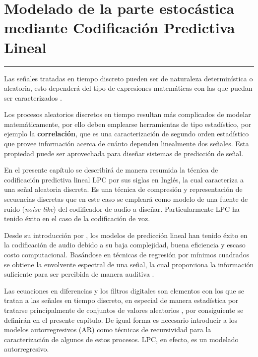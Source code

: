 
\chapter{Modelado de la parte estocástica \\ mediante Codificación Predictiva Lineal}\label{capit:cap4}
\vspace{-2.0325ex}%
\noindent
\rule{\textwidth}{0.5pt}
\vspace{-5.5ex}%
\newcommand{\pushline}{\Indp}%

Las señales tratadas en tiempo discreto pueden ser de naturaleza determinística o aleatoria, esto dependerá del tipo de expresiones matemáticas con las que puedan ser caracterizados \cite[]{Hayes96}. 

Los procesos aleatorios discretos en tiempo resultan más complicados de modelar matemáticamente, por ello deben emplearse herramientas de tipo estadístico, por ejemplo la \textbf{correlación}, que es una caracterización de segundo orden estadístico que provee información acerca de cuánto dependen linealmente dos señales. Esta propiedad puede ser aprovechada para diseñar sistemas de predicción de señal.

En el presente capítulo se describirá de manera resumida la técnica de codificación predictiva lineal LPC por sus siglas en Inglés, la cual caracteriza a una señal aleatoria discreta. Es una técnica de compresión y representación de secuencias discretas que en este caso se empleará como modelo de una fuente de ruido (\emph{noise-like}) del codificador de audio a diseñar. Particularmente LPC ha tenido éxito en el caso de la codificación de voz. 

Desde su introducción por \cite{Makhoul1973}, los modelos de predicción lineal han tenido éxito en la codificación de audio debido a su baja complejidad, buena eficiencia y escaso costo computacional. Basándose en técnicas de regresión por mínimos cuadrados se obtiene la envolvente espectral de una señal, la cual proporciona la información suficiente para ser percibida de manera auditiva \cite[]{Makhoul1975}.

Las ecuaciones en diferencias y los filtros digitales son elementos con los que se tratan a las señales en tiempo discreto, en especial de manera estadística por tratarse principalmente de conjuntos de valores aleatorios \cite[]{Hayes96}, por consiguiente se definirán en el presente capítulo. De igual forma es necesario introducir a los modelos autorregresivos (AR) como técnicas de recursividad para la caracterización de algunos de estos procesos. LPC, en efecto, es un modelado autorregresivo. 

